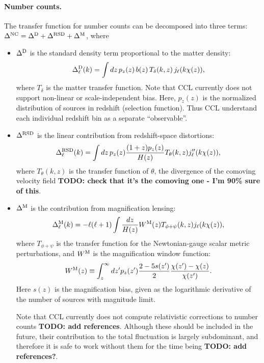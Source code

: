 \documentclass[\docopts]{\docclass}
\begin{document}
\paragraph{\bf Number counts.} The transfer function for number counts can be decomposed into three terms: $\Delta^{\rm NC}=\Delta^{\rm D}+\Delta^{\rm RSD}+\Delta^{\rm M}$, where
\begin{itemize}
  \item $\Delta^{\rm D}$ is the standard density term proportional to the matter density:
        \begin{equation}
          \Delta^{\rm D}_\ell(k)=\int dz\,p_z(z)\,b(z)\,T_\delta(k,z)\,j_\ell(k\chi(z)),
        \end{equation}
        where $T_\delta$ is the matter transfer function. Note that CCL currently does not support non-linear or scale-independent bias. Here, $p_z(z)$ is the normalized distribution of sources in redshift (selection function). Thus CCL understand each individual redshift bin as a separate ``observable''.
  \item $\Delta^{\rm RSD}$ is the linear contribution from redshift-space distortions:
        \begin{equation}
          \Delta^{\rm RSD}_\ell(k)=\int dz\,p_z(z)\frac{(1+z) p_z(z)}{H(z)}T_\theta(k,z) j_\ell''(k\chi(z)),
        \end{equation}
        where $T_\theta(k,z)$ is the transfer function of $\theta$, the divergence of the comoving velocity field {\bf TODO: check that it's the comoving one - I'm 90\% sure of this}.
  \item $\Delta^{\rm M}$ is the contribution from magnification lensing:
        \begin{equation}
          \Delta_\ell^{\rm M}(k)=-\ell(\ell+1)\int \frac{dz}{H(z)} W^{\rm M}(z) T_{\phi+\psi}(k,z) j_\ell(k\chi(z)),
        \end{equation}
        where $T_{\phi+\psi}$ is the transfer function for the Newtonian-gauge scalar metric perturbations, and $W^{\rm M}$ is the magnification window function:
        \begin{equation}
           W^{\rm M}(z)\equiv\int_z^\infty dz' p_z(z')\frac{2-5s(z')}{2}\frac{\chi(z')-\chi(z)}{\chi(z')}.
        \end{equation}
        Here $s(z)$ is the magnification bias, given as the logarithmic derivative of the number of sources with magnitude limit.
          
        Note that CCL currently does not compute relativistic corrections to number counts {\bf TODO: add references}. Although these should be included in the future, their contribution to the total fluctuation is largely subdominant, and therefore it is safe to work without them for the time being {\bf TODO: add references?}.
\end{itemize}
\end{document}
